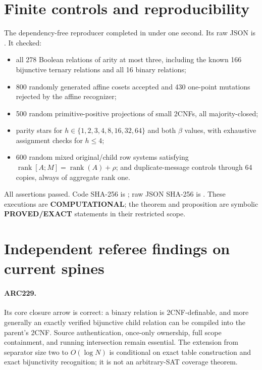 \documentclass[11pt]{article}
\begin{document}
\section{Finite controls and reproducibility}
The dependency-free reproducer
completed in under one second.  Its raw JSON is
.
It checked:
\begin{itemize}
\item all 278 Boolean relations of arity at most three, including the known
166 bijunctive ternary relations and all 16 binary relations;
\item 800 randomly generated affine cosets accepted and 430 one-point
mutations rejected by the affine recognizer;
\item 500 random primitive-positive projections of small 2CNFs, all
majority-closed;
\item parity stars for $h\in\{1,2,3,4,8,16,32,64\}$ and both $\beta$ values,
with exhaustive assignment checks for $h\le4$;
\item 600 random mixed original/child row systems satisfying
$\operatorname{rank}[A;M]=\operatorname{rank}(A)+\rho$; and duplicate-message
controls through 64 copies, always of aggregate rank one.
\end{itemize}
All assertions passed.  Code SHA-256 is
\texttt{};
raw JSON SHA-256 is
\texttt{}.
These executions are \textbf{COMPUTATIONAL}; the theorem and proposition are
symbolic \textbf{PROVED/EXACT} statements in their restricted scope.

\section{Independent referee findings on current spines}
\paragraph{ARC229.}
Its core closure arrow is correct: a binary relation is 2CNF-definable, and
more generally an exactly verified bijunctive child relation can be compiled
into the parent's 2CNF.  Source authentication, once-only ownership, full
scope containment, and running intersection remain essential.  The extension
from separator size two to $O(\log N)$ is conditional on exact table
construction and exact bijunctivity recognition; it is not an arbitrary-SAT
coverage theorem.
\end{document}
